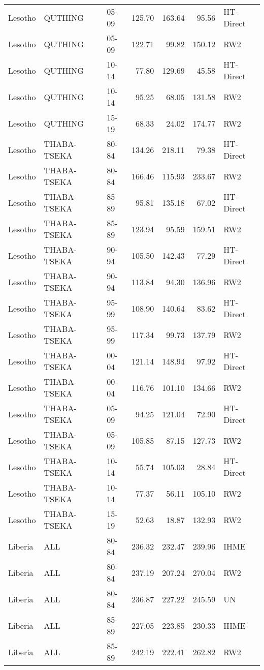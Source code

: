\begin{longtable}{lllrrrl}
  Lesotho & QUTHING & 05-09 & 125.70 & 163.64 & 95.56 & HT-Direct \\ 
  Lesotho & QUTHING & 05-09 & 122.71 & 99.82 & 150.12 & RW2 \\ 
  Lesotho & QUTHING & 10-14 & 77.80 & 129.69 & 45.58 & HT-Direct \\ 
  Lesotho & QUTHING & 10-14 & 95.25 & 68.05 & 131.58 & RW2 \\ 
  Lesotho & QUTHING & 15-19 & 68.33 & 24.02 & 174.77 & RW2 \\ 
  Lesotho & THABA-TSEKA & 80-84 & 134.26 & 218.11 & 79.38 & HT-Direct \\ 
  Lesotho & THABA-TSEKA & 80-84 & 166.46 & 115.93 & 233.67 & RW2 \\ 
  Lesotho & THABA-TSEKA & 85-89 & 95.81 & 135.18 & 67.02 & HT-Direct \\ 
  Lesotho & THABA-TSEKA & 85-89 & 123.94 & 95.59 & 159.51 & RW2 \\ 
  Lesotho & THABA-TSEKA & 90-94 & 105.50 & 142.43 & 77.29 & HT-Direct \\ 
  Lesotho & THABA-TSEKA & 90-94 & 113.84 & 94.30 & 136.96 & RW2 \\ 
  Lesotho & THABA-TSEKA & 95-99 & 108.90 & 140.64 & 83.62 & HT-Direct \\ 
  Lesotho & THABA-TSEKA & 95-99 & 117.34 & 99.73 & 137.79 & RW2 \\ 
  Lesotho & THABA-TSEKA & 00-04 & 121.14 & 148.94 & 97.92 & HT-Direct \\ 
  Lesotho & THABA-TSEKA & 00-04 & 116.76 & 101.10 & 134.66 & RW2 \\ 
  Lesotho & THABA-TSEKA & 05-09 & 94.25 & 121.04 & 72.90 & HT-Direct \\ 
  Lesotho & THABA-TSEKA & 05-09 & 105.85 & 87.15 & 127.73 & RW2 \\ 
  Lesotho & THABA-TSEKA & 10-14 & 55.74 & 105.03 & 28.84 & HT-Direct \\ 
  Lesotho & THABA-TSEKA & 10-14 & 77.37 & 56.11 & 105.10 & RW2 \\ 
  Lesotho & THABA-TSEKA & 15-19 & 52.63 & 18.87 & 132.93 & RW2 \\ 
  Liberia & ALL & 80-84 & 236.32 & 232.47 & 239.96 & IHME \\ 
  Liberia & ALL & 80-84 & 237.19 & 207.24 & 270.04 & RW2 \\ 
  Liberia & ALL & 80-84 & 236.87 & 227.22 & 245.59 & UN \\ 
  Liberia & ALL & 85-89 & 227.05 & 223.85 & 230.33 & IHME \\ 
  Liberia & ALL & 85-89 & 242.19 & 222.41 & 262.82 & RW2 \\ 

\end{longtable}
